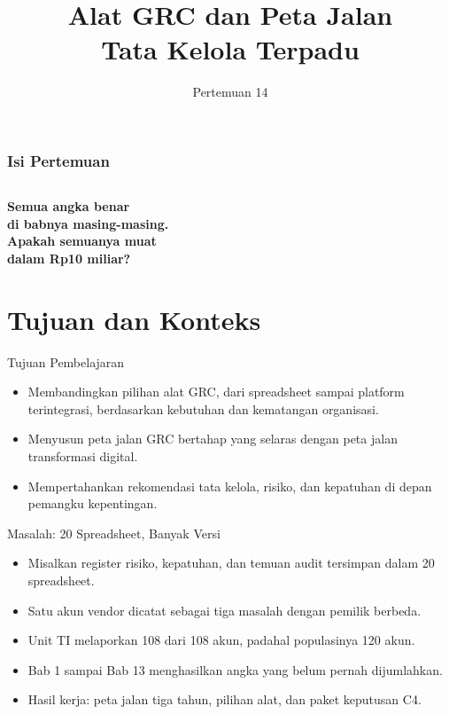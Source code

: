 \documentclass[aspectratio=169, table, 12pt]{beamer}
\title{\Huge Alat GRC dan Peta Jalan\\ \vspace{10pt} Tata Kelola Terpadu}
\date{Pertemuan 14}
\begin{document}
\frame{\titlepage}

\begin{frame}
  \frametitle{Isi Pertemuan}
  \vspace{14pt}
  \begin{columns}[t]
    {\small\tableofcontents[sections={1-4}]}

    {\small\tableofcontents[sections={5-8}]}
  \end{columns}
\end{frame}

\begin{frame}{\hfill}
  \centering
  \Huge{\textbf{Semua angka benar\\di babnya masing-masing.\\Apakah semuanya muat\\dalam Rp10 miliar?}}
\end{frame}

\section{Tujuan dan Konteks}

\begin{frame}{{\Large Tujuan Pembelajaran}}
  \vspace{10pt}
  \begin{itemize}
    \item Membandingkan pilihan alat GRC, dari spreadsheet sampai platform terintegrasi, berdasarkan
          kebutuhan dan kematangan organisasi.
    \item Menyusun peta jalan GRC bertahap yang selaras dengan peta jalan transformasi digital.
    \item Mempertahankan rekomendasi tata kelola, risiko, dan kepatuhan di depan pemangku
          kepentingan.
  \end{itemize}
\end{frame}

\begin{frame}{{\Large Masalah: 20 Spreadsheet, Banyak Versi}}
  \vspace{6pt}
  \small
  \begin{itemize}
    \item Misalkan register risiko, kepatuhan, dan temuan audit tersimpan dalam 20 spreadsheet.
    \item Satu akun vendor dicatat sebagai tiga masalah dengan pemilik berbeda.
    \item Unit TI melaporkan 108 dari 108 akun, padahal populasinya 120 akun.
    \item Bab 1 sampai Bab 13 menghasilkan angka yang belum pernah dijumlahkan.
    \item Hasil kerja: peta jalan tiga tahun, pilihan alat, dan paket keputusan C4.
  \end{itemize}
\end{frame}
\end{document}
